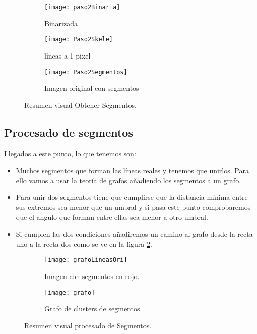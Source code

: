 \begin{figure}
\begin{subfigure}[c]{.5\linewidth}
\centering\large \texttt{[image: paso2Binaria]}
\caption{Binarizada}
\end{subfigure}%
\begin{subfigure}[c]{.5\linewidth}
\centering\large \texttt{[image: Paso2Skele]}
\caption{líneas a 1 pixel}
\end{subfigure}
\begin{subfigure}[c]{.5\linewidth}
\centering\large \texttt{[image: Paso2Segmentos]}
\caption{Imagen original con segmentos}
\end{subfigure}
\caption{Resumen visual Obtener Segmentos.}\label{fig:5.5}
\end{figure}

\subsection{Procesado de segmentos}
Llegados a este punto, lo que tenemos son:
\begin{itemize}
\item Muchos segmentos que forman las líneas reales y tenemos que unirlos. Para ello vamos a usar la teoría de grafos añadiendo los segmentos a un grafo.

\item Para unir dos segmentos tiene que cumplirse que la distancia mínima entre sus extremos sea menor que un umbral y si pasa este punto comprobaremos que el angulo que forman entre ellas sea menor a otro umbral.

\item Si cumplen las dos condiciones añadiremos un camino al grafo desde la recta uno a la recta dos como se ve en la figura \ref{fig:5.6}.
\end{itemize}


\begin{figure}
\begin{subfigure}[b]{.5\linewidth}
\centering\large \texttt{[image: grafoLineasOri]}
\caption{Imagen con segmentos en rojo.}
\end{subfigure}
\begin{subfigure}[b]{.5\linewidth}
\centering\large \texttt{[image: grafo]}
\caption{Grafo de clusters de segmentos.}
\end{subfigure}
\caption{Resumen visual procesado de Segmentos.}\label{fig:5.6}
\end{figure}

